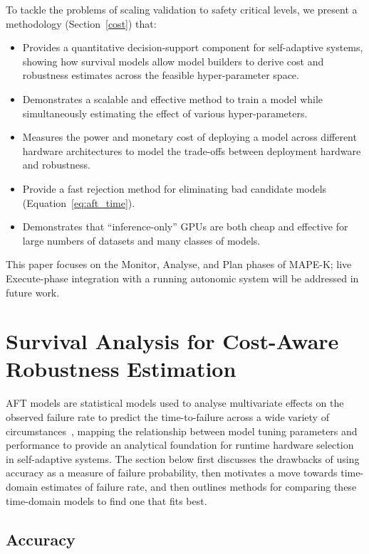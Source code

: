 \documentclass[conference]{IEEEtran}%
\begin{document}
To tackle the problems of scaling validation to safety critical levels, we present a methodology (Section~\ref{cost}) that:
\begin{itemize}
    \item Provides a quantitative decision-support component for self-adaptive systems, showing how survival models allow model builders to derive cost and robustness estimates across the feasible hyper-parameter space.
    \item Demonstrates a scalable and effective method to train a model while simultaneously estimating the effect of various hyper-parameters.
    \item Measures the power and monetary cost of deploying a model across different hardware architectures to model the trade-offs between deployment hardware and robustness.
    \item Provide a fast rejection method for eliminating bad candidate models (Equation~\ref{eq:aft_time}).
    \item Demonstrates that ``inference-only'' GPUs are both cheap and effective for large numbers of datasets and many classes of models. 
\end{itemize}
This paper focuses on the Monitor, Analyse, and Plan phases of MAPE-K\@; live Execute-phase integration with a running autonomic system will be addressed in future work.


\section{Survival Analysis for Cost-Aware Robustness Estimation}
\label{aft}

AFT models are statistical models used to analyse multivariate effects on the observed failure rate to predict the time-to-failure across a wide variety of circumstances~\cite{aft_models,kleinbaum1996survival}, mapping the relationship between model tuning parameters and performance to provide an analytical foundation for runtime hardware selection in self-adaptive systems.
The section below first discusses the drawbacks of using accuracy as a measure of failure probability, then motivates a move towards time-domain estimates of failure rate, and then outlines methods for comparing these time-domain models to find one that fits best.

\subsection{Accuracy}
\label{acc}
\end{document}

